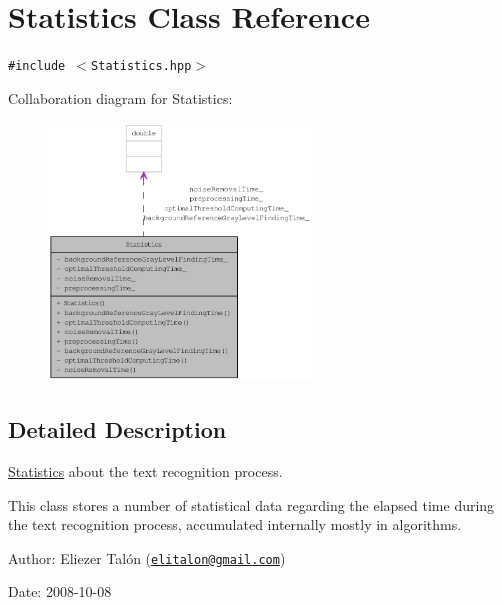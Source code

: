 \hypertarget{class_statistics}{
\section{Statistics Class Reference}
\label{class_statistics}
}
{\tt \#include $<$Statistics.hpp$>$}

Collaboration diagram for Statistics:\nopagebreak
\begin{figure}[H]
\begin{center}
\leavevmode
\includegraphics[width=198pt]{class_statistics__coll__graph}
\end{center}
\end{figure}


\subsection{Detailed Description}
\hyperlink{class_statistics}{Statistics} about the text recognition process. 

This class stores a number of statistical data regarding the elapsed time during the text recognition process, accumulated internally mostly in algorithms.

\begin{Desc}
\item[Author:]Eliezer Talón (\href{mailto:elitalon@gmail.com}{\tt elitalon@gmail.com}) \end{Desc}
\begin{Desc}
\item[Date:]2008-10-08 \end{Desc}


